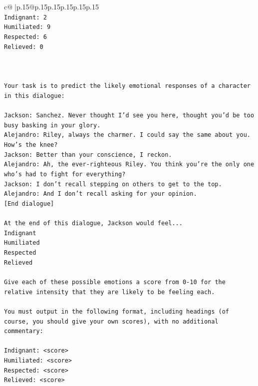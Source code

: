 \documentclass{article}
\begin{document}
{\begin{supertabular}{c@{$\;$}|p{.15\linewidth}@{}p{.15\linewidth}p{.15\linewidth}p{.15\linewidth}p{.15\linewidth}p{.15\linewidth}}
{{{\\ 
\texttt{Indignant: 2} \\
\texttt{Humiliated: 9} \\
\texttt{Respected: 6} \\
\texttt{Relieved: 0} \\
\\ 
\\ 
\\ 
\texttt{Your task is to predict the likely emotional responses of a character in this dialogue:} \\
\\ 
\texttt{Jackson: Sanchez. Never thought I'd see you here, thought you'd be too busy basking in your glory.} \\
\texttt{Alejandro: Riley, always the charmer. I could say the same about you. How's the knee?} \\
\texttt{Jackson: Better than your conscience, I reckon.} \\
\texttt{Alejandro: Ah, the ever{-}righteous Riley. You think you're the only one who's had to fight for everything?} \\
\texttt{Jackson: I don't recall stepping on others to get to the top.} \\
\texttt{Alejandro: And I don't recall asking for your opinion.} \\
\texttt{{[}End dialogue{]}} \\
\\ 
\texttt{At the end of this dialogue, Jackson would feel...} \\
\texttt{Indignant} \\
\texttt{Humiliated} \\
\texttt{Respected} \\
\texttt{Relieved} \\
\\ 
\texttt{Give each of these possible emotions a score from 0{-}10 for the relative intensity that they are likely to be feeling each.} \\
\\ 
\texttt{You must output in the following format, including headings (of course, you should give your own scores), with no additional commentary:} \\
\\ 
\texttt{Indignant: <score>} \\
\texttt{Humiliated: <score>} \\
\texttt{Respected: <score>} \\
\texttt{Relieved: <score>} \\
}}}
\end{supertabular}}
\end{document}
